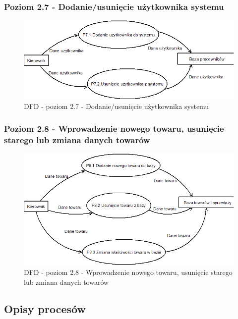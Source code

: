 \subsubsection{Poziom 2.7 - Dodanie/usunięcie użytkownika systemu}
\begin{figure}[h]
\includegraphics[width=1\textwidth]{gfx/dfd-2-7.png}
\caption{DFD - poziom 2.7 - Dodanie/usunięcie użytkownika systemu}
\end{figure}
\clearpage
\subsubsection{Poziom 2.8 - Wprowadzenie nowego towaru, usunięcie starego lub zmiana danych towarów}
\begin{figure}[h]
\includegraphics[width=1\textwidth]{gfx/dfd-2-8.png}
\caption{DFD - poziom 2.8 - Wprowadzenie nowego towaru, usunięcie starego lub zmiana danych towarów}
\end{figure}
\clearpage
\subsection{Opisy procesów}
